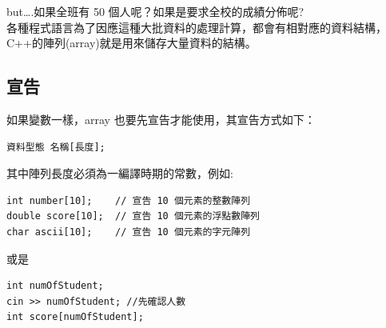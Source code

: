 \documentclass[a4paper,12pt]{article}
\begin{document}
but\ldots{}.如果全班有 50 個人呢？如果是要求全校的成績分佈呢?\\

各種程式語言為了因應這種大批資料的處理計算，都會有相對應的資料結構，C++的陣列(array)就是用來儲存大量資料的結構。\\
\subsection{宣告}
\label{sec:org88029b4}
如果變數一樣，array 也要先宣告才能使用，其宣告方式如下：\\
\lstset{breaklines=true,language=cpp,label= ,caption= ,captionpos=b,firstnumber=1,numbers=left}
\begin{lstlisting}
資料型態 名稱[長度];
\end{lstlisting}

其中陣列長度必須為一編譯時期的常數，例如:\\
\lstset{breaklines=true,language=cpp,label= ,caption= ,captionpos=b,firstnumber=1,numbers=left}
\begin{lstlisting}
int number[10];    // 宣告 10 個元素的整數陣列
double score[10];  // 宣告 10 個元素的浮點數陣列
char ascii[10];    // 宣告 10 個元素的字元陣列
\end{lstlisting}

或是\\
\lstset{breaklines=true,language=cpp,label= ,caption= ,captionpos=b,firstnumber=1,numbers=left}
\begin{lstlisting}
int numOfStudent;
cin >> numOfStudent; //先確認人數
int score[numOfStudent];
\end{lstlisting}
\end{document}
